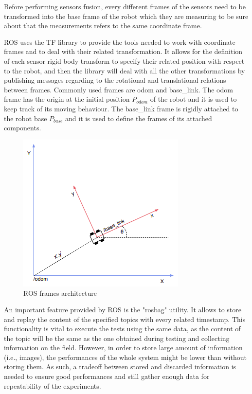 Before performing sensors fusion, every different frames of the sensors need to be transformed into the base frame of the robot which they are measuring to be sure about that the measurements refers to the same coordinate frame.

\Gls{ROS} uses the TF\cite{6556373} library to provide the tools needed to work with coordinate frames and to deal with their related transformation.
It allows for the definition of each sensor rigid body transform to specify their related position with respect to the robot, and then the library will deal with all the other transformations by publishing messages regarding to the rotational and translational relations between frames.
Commonly used frames are odom and base\_link. The odom frame has the origin at the initial position $P_{odom}$ of the robot and it is used to keep track of its moving behaviour. The base\_link frame is rigidly attached to the robot base $P_{base}$ and it is used to define the frames of its attached components.

\begin{figure}[!ht]
	\begin{center}
		\includegraphics[width=0.75\textwidth]{Images/2-Background/Frames-2021-04-22 12-03-22.png}
	\end{center}
	\caption{\Gls{ROS} frames architecture}%
	\label{fig:ros-frame}
\end{figure}

An important feature provided by \gls{ROS} is the "rosbag" utility. 
It allows to store and replay the content of the specified topics with every related timestamp.
This functionality is vital to execute the tests using the same data, as the content of the topic will be the same as the one obtained during testing and collecting information on the field.
However, in order to store large amount of information (i.e., images), the performances of the whole system might be lower than without storing them. As such, a tradeoff between stored and discarded information is needed to ensure good performances and still gather enough data for repeatability of the experiments.


